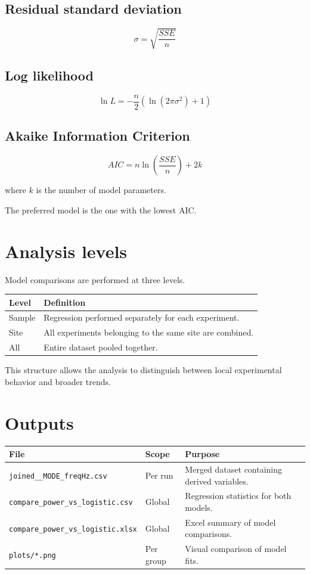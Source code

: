 \documentclass[11pt]{article}
\begin{document}
\subsection{Residual standard deviation}

\[
\sigma = \sqrt{\frac{SSE}{n}}
\]

\subsection{Log likelihood}

\[
\ln L =
-\frac{n}{2}
\left(
\ln(2\pi\sigma^2) + 1
\right)
\]

\subsection{Akaike Information Criterion}

\[
AIC = n\ln\left(\frac{SSE}{n}\right) + 2k
\]

where $k$ is the number of model parameters.

The preferred model is the one with the lowest AIC.

\section{Analysis levels}

Model comparisons are performed at three levels.

\begin{longtable}{p{} p{}}
\toprule
\textbf{Level} & \textbf{Definition}\\
\midrule
\endhead
Sample & Regression performed separately for each experiment.\\
Site & All experiments belonging to the same site are combined.\\
All & Entire dataset pooled together.\\
\bottomrule
\end{longtable}

This structure allows the analysis to distinguish between local experimental behavior and broader trends.

\section{Outputs}

\begin{longtable}{p{} p{} p{}}
\toprule
\textbf{File} & \textbf{Scope} & \textbf{Purpose}\\
\midrule
\endhead
\texttt{joined\_\_MODE\_freqHz.csv} & Per run & Merged dataset containing derived variables.\\
\texttt{compare\_power\_vs\_logistic.csv} & Global & Regression statistics for both models.\\
\texttt{compare\_power\_vs\_logistic.xlsx} & Global & Excel summary of model comparisons.\\
\texttt{plots/*.png} & Per group & Visual comparison of model fits.\\
\bottomrule
\end{longtable}
\end{document}
